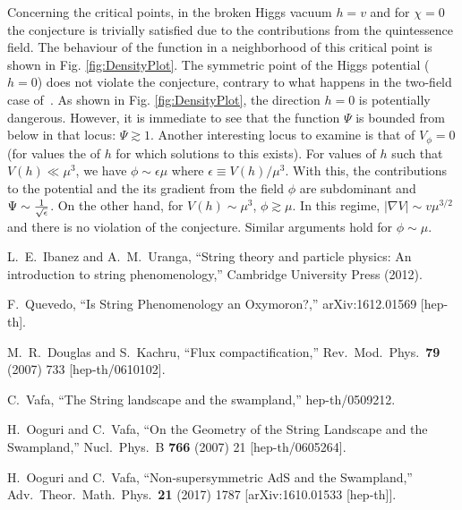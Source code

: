 \documentclass[11pt,a4paper]{article}
\begin{document}
\begin{itemize}
Concerning the critical points, in the broken Higgs vacuum ${h} = {v}$ and for ${\chi} = 0$ the conjecture is trivially satisfied due to the contributions from the quintessence field. The behaviour of the function in a neighborhood of this critical point is shown in Fig. \ref{fig:DensityPlot}. The symmetric point of the Higgs potential ($h = 0$) does not violate the conjecture, contrary to what happens in the two-field case of~\cite{Denef:2018etk}. As shown in Fig. \ref{fig:DensityPlot}, the direction $h = 0$ is potentially dangerous. However, it is immediate to see that the function $\Psi$ is bounded from below in that locus: $\Psi \gtrsim 1$. Another interesting locus to examine is that of $V_{\phi} = 0$ (for values the of $h$ for which solutions to this exists). For values of $h$ such that $V(h) \ll  \mu^3$, we have $\phi \sim \epsilon \mu$ where $\epsilon \equiv V(h)/  \mu^3 $. With this, the contributions to the potential and the its gradient from the field $\phi$ are subdominant  and $\Psi \sim {1 \over \sqrt{\epsilon}}$. On the other hand, for $V(h) \sim 
\mu^3$, $\phi \gtrsim \mu$. In this regime, $|\nabla V| \sim  v \mu^{3/2}$ and there is no violation of the conjecture. Similar arguments hold for $\phi \sim \mu$.



\begin{thebibliography}{99}

  L.~E.~Ibanez and A.~M.~Uranga,
  ``String theory and particle physics: An introduction to string phenomenology,'' Cambridge University Press (2012).

  F.~Quevedo,
  ``Is String Phenomenology an Oxymoron?,''
  arXiv:1612.01569 [hep-th].

  M.~R.~Douglas and S.~Kachru,
  ``Flux compactification,''
  Rev.\ Mod.\ Phys.\  {\bf 79} (2007) 733
  [hep-th/0610102].

  C.~Vafa,
  ``The String landscape and the swampland,''
  hep-th/0509212.

  H.~Ooguri and C.~Vafa,
  ``On the Geometry of the String Landscape and the Swampland,''
  Nucl.\ Phys.\ B {\bf 766} (2007) 21
  [hep-th/0605264].

  H.~Ooguri and C.~Vafa,
  ``Non-supersymmetric AdS and the Swampland,''
  Adv.\ Theor.\ Math.\ Phys.\  {\bf 21} (2017) 1787
  [arXiv:1610.01533 [hep-th]].


\end{thebibliography}
\end{itemize}
\end{document}
